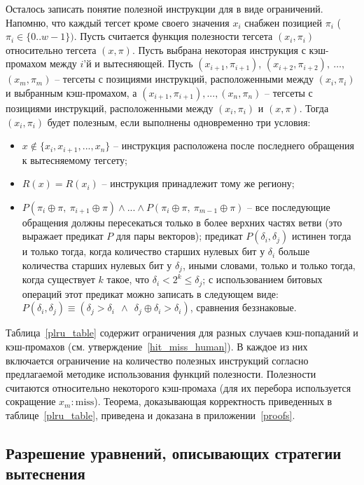 Осталось записать понятие полезной инструкции для \PseudoLRU в виде
ограничений. Напомню, что каждый тегсет кроме своего значения $x_i$
снабжен позицией $\pi_i$ ($\pi_i \in \{0..w{-}1\})$. Пусть считается
функция полезности тегсета $(x_i, \pi_i)$ относительно тегсета
$(x,\pi)$. Пусть выбрана некоторая инструкция с кэш-промахом между
$i$'й и вытесняющей. Пусть $(x_{i+1},\pi_{i+1})$,
$(x_{i+2},\pi_{i+2}), ~\dots,$ $(x_m, \pi_m)$ -- тегсеты с позициями
инструкций, расположенными между $(x_i, \pi_i)$ и выбранным
кэш-промахом, а $(x_{i+1},\pi_{i+1}), ..., (x_n, \pi_n)$ -- тегсеты
с позициями инструкций, расположенными между $(x_i, \pi_i)$ и $(x,
\pi)$. Тогда $(x_i, \pi_i)$ будет полезным, если выполнены
одновременно три условия:
\begin{itemize}
\item $x \notin \{x_i, x_{i+1}, ..., x_n\}$ -- инструкция
расположена после последнего обращения к вытесняемому тегсету;
\item $R(x) = R(x_i)$ -- инструкция принадлежит тому же региону;
\item $P(\pi_i \oplus \pi,~\pi_{i+1} \oplus \pi) \wedge ... \wedge
P(\pi_i \oplus \pi,~\pi_{m-1} \oplus \pi)$ -- все последующие
обращения должны пересекаться только в более верхних частях ветви
(это выражает предикат $P$ для пары векторов); предикат $P(\delta_i,
\delta_j)$ истинен тогда и только тогда, когда количество старших
нулевых бит у $\delta_i$ больше количества старших нулевых бит у
$\delta_j$, иными словами, только и только тогда, когда существует
$k$ такое, что $\delta_i < 2^k \leqslant \delta_j$; с использованием
битовых операций этот предикат можно записать в следующем виде:
$P(\delta_i, \delta_j) \equiv (\delta_j
> \delta_i~~\wedge~~\delta_j \oplus \delta_i > \delta_i)$, сравнения
беззнаковые.
\end{itemize}

Таблица~\ref{plru_table} содержит ограничения для разных случаев
кэш-попаданий и кэш-промахов (см. утверждение~\ref{hit_miss_human}).
В каждое из них включается ограничение на количество полезных
инструкций согласно предлагаемой методике использования функций
полезности. Полезности считаются относительно некоторого кэш-промаха
(для их перебора используется сокращение $x_m : \mbox{miss}$). Теорема,
доказывающая корректность приведенных в таблице~\ref{plru_table}, приведена
и доказана в приложении~\ref{proofs}.


\subsection{Разрешение уравнений, описывающих стратегии вытеснения}

